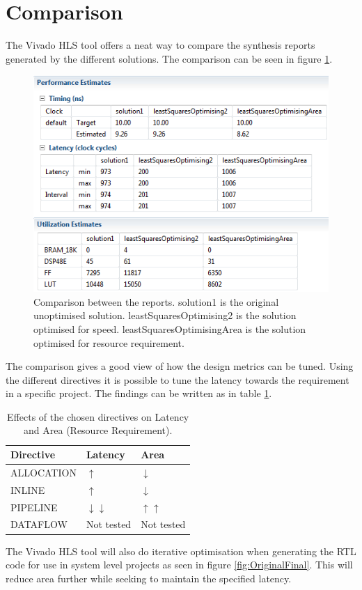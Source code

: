\section{Comparison}
\label{sec:Comp}
The Vivado HLS tool offers a neat way to compare the synthesis reports generated by the different solutions. The comparison can be seen in figure \ref{fig:CompareReports}.
\begin{figure}[H]
\centering
\includegraphics[scale=1]{billeder/CompareReports}
\caption{Comparison between the reports. solution1 is the original unoptimised solution. leastSquaresOptimising2 is the solution optimised for speed. leastSquaresOptimisingArea is the solution optimised for resource requirement.}
\label{fig:CompareReports}
\end{figure}
The comparison gives a good view of how the design metrics can be tuned. Using the different directives it is possible to tune the latency towards the requirement in a specific project. The findings can be written as in table \ref{tab:effects}.
\begin{table}[H]
\centering
    \begin{tabular}{|l|l|l|}
    \hline
    Directive  & Latency    & Area       \\  \hline
    ALLOCATION & $\uparrow$    & $\downarrow$  \\
    INLINE     & $\uparrow$    & $\downarrow$  \\
    PIPELINE   & $\downarrow\downarrow$  & $\uparrow\uparrow$    \\
    DATAFLOW   & Not tested & Not tested \\ \hline
    \end{tabular}
    \caption{Effects of the chosen directives on Latency and Area (Resource Requirement).}
    \label{tab:effects}
\end{table}
The Vivado HLS tool will also do iterative optimisation when generating the RTL code for use in system level projects as seen in figure \ref{fig:OriginalFinal}. This will reduce area further while seeking to maintain the specified latency.